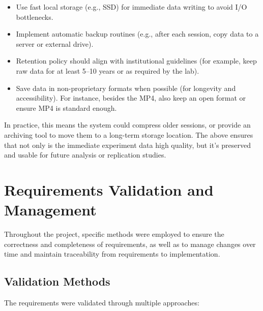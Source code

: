 \documentclass[11pt,a4paper]{report}
\begin{document}
\begin{itemize}
\item Use fast local storage (e.g., SSD) for immediate data writing to avoid I/O bottlenecks.
\item Implement automatic backup routines (e.g., after each session, copy data to a server or external drive).
\item Retention policy should align with institutional guidelines (for example, keep raw data for at least 5--10 years or as required by the lab).
\item Save data in non-proprietary formats when possible (for longevity and accessibility). For instance, besides the MP4, also keep an open format or ensure MP4 is standard enough.
\end{itemize} In practice, this means the system could compress older sessions, or provide an archiving tool to move them to a long-term storage location. The above ensures that not only is the immediate experiment data high quality, but it's preserved and usable for future analysis or replication studies. \section{Requirements Validation and Management}
Throughout the project, specific methods were employed to ensure the correctness and completeness of requirements, as well as to manage changes over time and maintain traceability from requirements to implementation. \subsection{Validation Methods}
The requirements were validated through multiple approaches:
\end{document}
